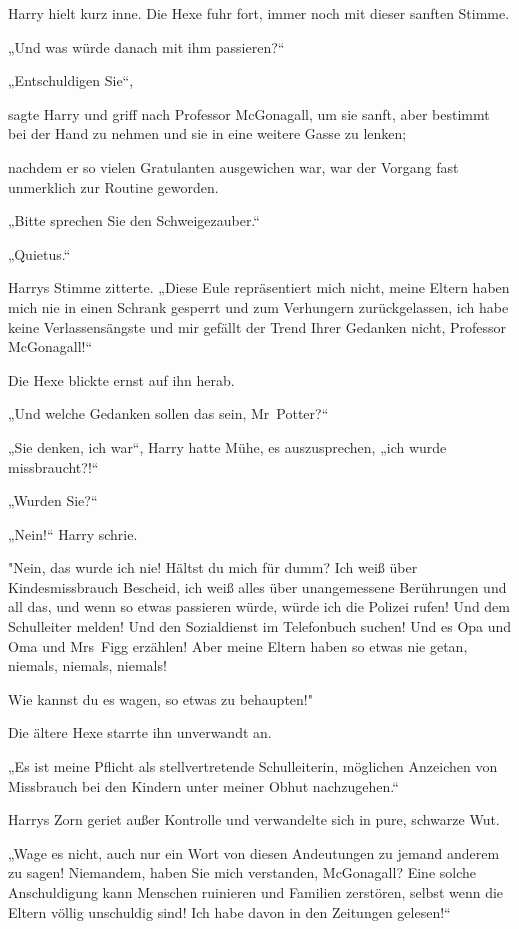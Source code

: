 {Harry hielt kurz inne. Die Hexe fuhr fort, immer noch mit dieser sanften Stimme.

„Und was würde danach mit ihm passieren?“

„Entschuldigen Sie“,

sagte Harry und griff nach Professor McGonagall, um sie sanft, aber bestimmt bei der Hand zu nehmen und sie in eine weitere Gasse zu lenken;

nachdem er so vielen Gratulanten ausgewichen war, war der Vorgang fast unmerklich zur Routine geworden.

„Bitte sprechen Sie den Schweigezauber.“

„Quietus.“

Harrys Stimme zitterte. „Diese Eule repräsentiert mich nicht, meine Eltern haben mich nie in einen Schrank gesperrt und zum Verhungern zurückgelassen, ich habe keine Verlassensängste und mir gefällt der Trend Ihrer Gedanken nicht, Professor McGonagall!“

Die Hexe blickte ernst auf ihn herab.

„Und welche Gedanken sollen das sein, Mr~Potter?“

„Sie denken, ich war“, Harry hatte Mühe, es auszusprechen, „ich wurde missbraucht?!“

„Wurden Sie?“

„Nein!“ Harry schrie.

"Nein, das wurde ich nie! Hältst du mich für dumm? Ich weiß über Kindesmissbrauch Bescheid, ich weiß alles über unangemessene Berührungen und all das, und wenn so etwas passieren würde, würde ich die Polizei rufen! Und dem Schulleiter melden! Und den Sozialdienst im Telefonbuch suchen! Und es Opa und Oma und Mrs~Figg erzählen! Aber meine Eltern haben so etwas nie getan, niemals, niemals, niemals!

Wie kannst du es wagen, so etwas zu behaupten!"

Die ältere Hexe starrte ihn unverwandt an.

„Es ist meine Pflicht als stellvertretende Schulleiterin, möglichen Anzeichen von Missbrauch bei den Kindern unter meiner Obhut nachzugehen.“

Harrys Zorn geriet außer Kontrolle und verwandelte sich in pure, schwarze Wut.

„Wage es nicht, auch nur ein Wort von diesen Andeutungen zu jemand anderem zu sagen! Niemandem, haben Sie mich verstanden, McGonagall? Eine solche Anschuldigung kann Menschen ruinieren und Familien zerstören, selbst wenn die Eltern völlig unschuldig sind! Ich habe davon in den Zeitungen gelesen!“

}
